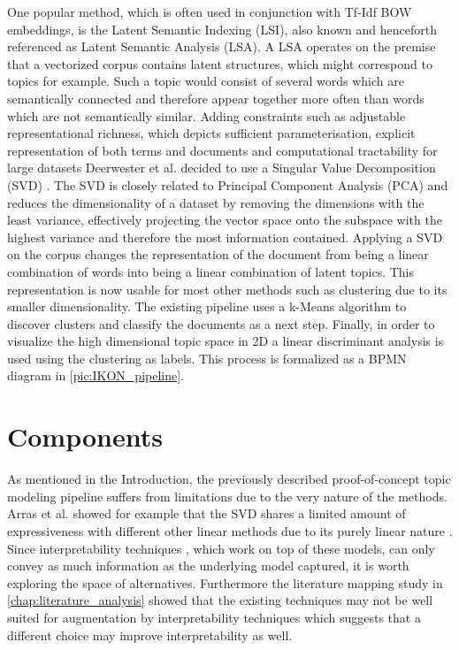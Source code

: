 One popular method, which is often used in conjunction with Tf-Idf BOW embeddings, is the Latent Semantic Indexing (LSI), also known and henceforth referenced as Latent Semantic Analysis (LSA). A LSA operates on the premise that a vectorized corpus contains latent structures, which might correspond to topics for example. Such a topic would consist of several words which are semantically connected and therefore appear together more often than words which are not semantically similar. Adding constraints such as adjustable representational richness, which depicts sufficient parameterisation, explicit representation of both terms and documents and computational tractability for large datasets Deerwester et al. decided to use a Singular Value Decomposition (SVD) \cite{deerwesterIndexingLatentSemantic}. The SVD is closely related to Principal Component Analysis (PCA) and reduces the dimensionality of a dataset by removing the dimensions with the least variance, effectively projecting the vector space onto the subspace with the highest variance and therefore the most information contained. Applying a SVD on the corpus changes the representation of the document from being a linear combination of words into being a linear combination of latent topics. This representation is now usable for most other methods such as clustering due to its smaller dimensionality. The existing pipeline uses a k-Means algorithm to discover clusters and classify the documents as a next step. Finally, in order to visualize the high dimensional topic space in 2D a linear discriminant analysis is used using the clustering as labels. This process is formalized as a BPMN diagram in \autoref{pic:IKON_pipeline}.

\section{Components}

As mentioned in the Introduction, the previously described proof-of-concept topic modeling pipeline suffers from limitations due to the very nature of the methods. Arras et al. showed for example that the SVD shares a limited amount of expressiveness with different other linear methods due to its purely linear nature \cite{arrasWhatRelevantText2017b}. Since interpretability techniques , which work on top of these models, can only convey as much information as the underlying model captured, it is worth exploring the space of alternatives. Furthermore the literature mapping study in \autoref{chap:literature_analysis} showed that the existing techniques may not be well suited for augmentation by interpretability techniques which suggests that a different choice may improve interpretability as well.


